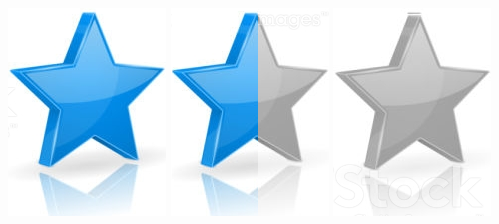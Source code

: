 \documentclass[10pt,a4paper,sans]{article}
\begin{document}
\begin{minipage}[t]{0.26\textwidth}
\begin{mdframed}[style=cadreCompetences]
\begin{itemize}
{                    \includegraphics[scale=0.20]{img/star.png} \hspace{-0.2cm}
                    \includegraphics[scale=0.20]{img/half_star.png} \hspace{-0.2cm}
                    \includegraphics[scale=0.20]{img/empty_star.png}}
            \end{itemize}

\end{mdframed}
\end{minipage}
\end{document}
